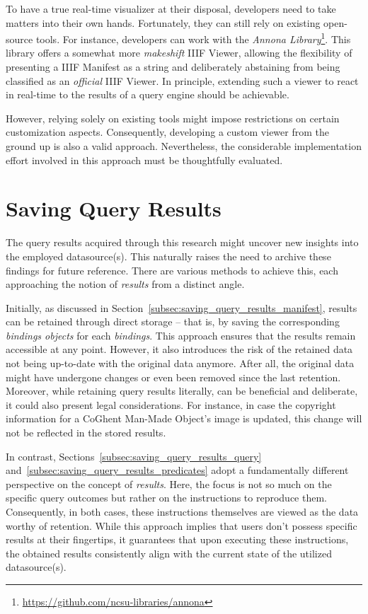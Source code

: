To have a true real-time visualizer at their disposal, developers need to take matters into their own hands. Fortunately, they can still rely on existing open-source tools. For instance, developers can work with the \textit{Annona Library}\footnote{\url{https://github.com/ncsu-libraries/annona}}. This library offers a somewhat more \textit{makeshift} IIIF Viewer, allowing the flexibility of presenting a IIIF Manifest as a string and deliberately abstaining from being classified as an \textit{official} IIIF Viewer. In principle, extending such a viewer to react in real-time to the results of a query engine should be achievable.

However, relying solely on existing tools might impose restrictions on certain customization aspects. Consequently, developing a custom viewer from the ground up is also a valid approach. Nevertheless, the considerable implementation effort involved in this approach must be thoughtfully evaluated.

\section{Saving Query Results}
\label{sec:saving_query_results}

The query results acquired through this research might uncover new insights into the employed datasource(s). This naturally raises the need to archive these findings for future reference. There are various methods to achieve this, each approaching the notion of \textit{results} from a distinct angle.

Initially, as discussed in Section~\ref{subsec:saving_query_results_manifest}, results can be retained through direct storage – that is, by saving the corresponding \textit{bindings objects} for each \textit{bindings}. This approach ensures that the results remain accessible at any point. However, it also introduces the risk of the retained data not being up-to-date with the original data anymore. After all, the original data might have undergone changes or even been removed since the last retention. Moreover, while retaining query results literally, can be beneficial and deliberate, it could also present legal considerations. For instance, in case the copyright information for a CoGhent Man-Made Object's image is updated, this change will not be reflected in the stored results.

In contrast, Sections~\ref{subsec:saving_query_results_query} and~\ref{subsec:saving_query_results_predicates} adopt a fundamentally different perspective on the concept of \textit{results}. Here, the focus is not so much on the specific query outcomes but rather on the instructions to reproduce them. Consequently, in both cases, these instructions themselves are viewed as the data worthy of retention. While this approach implies that users don't possess specific results at their fingertips, it guarantees that upon executing these instructions, the obtained results consistently align with the current state of the utilized datasource(s).

